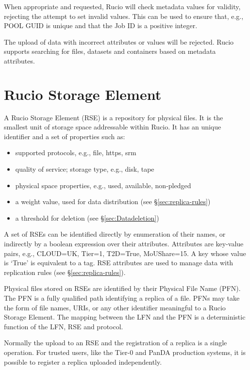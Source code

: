 \documentclass{atlasnote}
\begin{document}
When appropriate and requested, Rucio will check metadata values for validity, rejecting the attempt to set invalid values. This can be used to ensure that, e.g., POOL GUID is unique and that the Job ID is a positive integer.

The upload of data with incorrect attributes or values will be rejected. Rucio supports searching for files, datasets and containers based on metadata attributes.

\section{Rucio Storage Element}
\label{overview_Rucio_Storage_Element:rucio-storage-element}

A Rucio Storage Element (RSE) is a repository for physical files. It is the smallest unit of storage space addressable within Rucio. It has an unique identifier and a set of properties such as:

\begin{itemize}
\item supported protocols, e.g., file, https, srm
\item quality of service; storage type, e.g., disk, tape
\item physical space properties, e.g., used, available, non-pledged
\item a weight value, used for data distribution (see \S \ref{sec:replica-rules})
\item a threshold for deletion (see \S \ref{sec:Datadeletion})
\end{itemize}

\noindent A set of RSEs can be identified directly by enumeration of their names, or indirectly by a boolean expression over their attributes. Attributes are key-value pairs, e.g., CLOUD=UK, Tier=1, T2D=True, MoUShare=15. A key whose value is ‘True’ is equivalent to a tag. RSE attributes are used to manage data with replication rules (see \S \ref{sec:replica-rules}).

Physical files stored on RSEs are identified by their Physical File Name (PFN). The PFN is a fully qualified path identifying a replica of a file. PFNs may take the form of file names, URIs, or any other identifier meaningful to a Rucio Storage Element. The mapping between the LFN and the PFN is a deterministic function of the LFN, RSE and protocol.

Normally the upload to an RSE and the registration of a replica is a single operation. For trusted users, like the Tier-0 and PanDA production systems, it is possible to register a replica uploaded independently.
\end{document}
